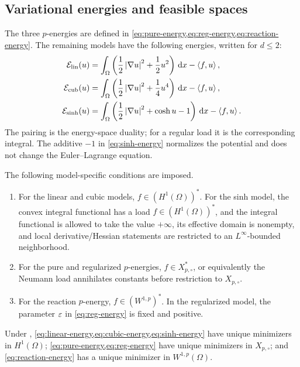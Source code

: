 \subsection{Variational energies and feasible spaces}
\label{sec:models}

The three \(p\)-energies are defined in \cref{eq:pure-energy,eq:reg-energy,eq:reaction-energy}. The
remaining models have the following energies, written for \(d\leq2\):
\begin{align}
 \mathcal{E}_{\rm lin}(u)&=\int_\Omega\left(\frac12\left\lvert \nabla u\right\rvert^2+
 \frac12u^2\right)\,\mathrm{d} x-\left\langle f,u\right\rangle,
 \label{eq:linear-energy}\\
 \mathcal{E}_{\rm cub}(u)&=\int_\Omega\left(\frac12\left\lvert \nabla u\right\rvert^2+
 \frac14u^4\right)\,\mathrm{d} x-\left\langle f,u\right\rangle,
 \label{eq:cubic-energy}\\
 \mathcal{E}_{\sinh}(u)&=\int_\Omega\left(\frac12\left\lvert \nabla u\right\rvert^2+
 \cosh u-1\right)\,\mathrm{d} x-\left\langle f,u\right\rangle.
 \label{eq:sinh-energy}
\end{align}
The pairing is the energy-space duality; for a regular load it is the corresponding integral.
The additive \(-1\) in \cref{eq:sinh-energy} normalizes the
potential and does not change the Euler--Lagrange equation.

\begin{assumption}
\label{ass:model-data}
The following model-specific conditions are imposed.
\begin{enumerate}[label=\textup{(\roman*)}]
 \item For the linear and cubic models, \(f\in (H^1(\Omega))^*\). For the sinh model, the convex
 integral functional has a load \(f\in(H^1(\Omega))^*\), and the
 integral functional is allowed to take the value \(+\infty\), its effective domain is nonempty, and
 local derivative/Hessian statements are restricted to an \(L^\infty\)-bounded neighborhood.
 \item For the pure and regularized \(p\)-energies, \(f\in X_{p,\circ}^*\), or equivalently the Neumann
 load annihilates constants before restriction to \(X_{p,\circ}\).
 \item For the reaction \(p\)-energy, \(f\in(W^{1,p})^*\). In the regularized model, the parameter
 \(\varepsilon\) in \cref{eq:reg-energy} is fixed and positive.
\end{enumerate}
\end{assumption}

\begin{proposition}
\label{prop:wellposedness}
Under , \cref{eq:linear-energy,eq:cubic-energy,eq:sinh-energy} have unique minimizers
in \(H^1(\Omega)\); \cref{eq:pure-energy,eq:reg-energy} have unique minimizers in \(X_{p,\circ}\); and
\cref{eq:reaction-energy} has a unique minimizer in \(W^{1,p}(\Omega)\).
\end{proposition}

